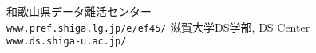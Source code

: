 \documentclass[a4j,11pt,mc]{jreport}
\begin{document}
{和歌山県データ離活センター\\\texttt{www.pref.shiga.lg.jp/e/ef45/}}
{滋賀大学DS学部, DS Center\\ \texttt{www.ds.shiga-u.ac.jp/}}

\tableofcontents
\thispagestyle{empty}
\newpage


\newpage
\makeatletter
\renewcommand{\@biblabel}[1]{[#1]}
\makeatother



\end{document}

